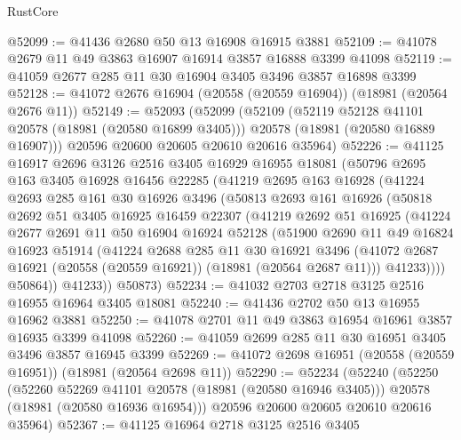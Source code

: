 \begin{lexlean}{RustCore}
\begin{coremodule}
@52099 := @41436 @2680 @50 @13 @16908 @16915 @3881
@52109 := @41078 @2679 @11 @49 @3863 @16907 @16914 @3857 @16888 @3399 @41098
@52119 := @41059 @2677 @285 @11 @30 @16904 @3405 @3496 @3857 @16898 @3399
@52128 := @41072 @2676 @16904 (@20558 (@20559 @16904)) (@18981 (@20564 @2676 @11))
@52149 := @52093
    (@52099
      (@52109
        (@52119 @52128 @41101 @20578 (@18981 (@20580 @16899 @3405)))
        @20578
        (@18981 (@20580 @16889 @16907)))
      @20596
      @20600
      @20605
      @20610
      @20616
      @35964)
@52226 := @41125
    @16917
    @2696
    @3126
    @2516
    @3405
    @16929
    @16955
    @18081
    (@50796
      @2695
      @163
      @3405
      @16928
      @16456
      @22285
      (@41219
        @2695
        @163
        @16928
        (@41224
          @2693
          @285
          @161
          @30
          @16926
          @3496
          (@50813
            @2693
            @161
            @16926
            (@50818
              @2692
              @51
              @3405
              @16925
              @16459
              @22307
              (@41219
                @2692
                @51
                @16925
                (@41224
                  @2677
                  @2691
                  @11
                  @50
                  @16904
                  @16924
                  @52128
                  (@51900
                    @2690
                    @11
                    @49
                    @16824
                    @16923
                    @51914
                    (@41224
                      @2688
                      @285
                      @11
                      @30
                      @16921
                      @3496
                      (@41072 @2687 @16921 (@20558 (@20559 @16921)) (@18981 (@20564 @2687 @11)))
                      @41233))))
              @50864))
          @41233))
      @50873)
@52234 := @41032 @2703 @2718 @3125 @2516 @16955 @16964 @3405 @18081
@52240 := @41436 @2702 @50 @13 @16955 @16962 @3881
@52250 := @41078 @2701 @11 @49 @3863 @16954 @16961 @3857 @16935 @3399 @41098
@52260 := @41059 @2699 @285 @11 @30 @16951 @3405 @3496 @3857 @16945 @3399
@52269 := @41072 @2698 @16951 (@20558 (@20559 @16951)) (@18981 (@20564 @2698 @11))
@52290 := @52234
    (@52240
      (@52250
        (@52260 @52269 @41101 @20578 (@18981 (@20580 @16946 @3405)))
        @20578
        (@18981 (@20580 @16936 @16954)))
      @20596
      @20600
      @20605
      @20610
      @20616
      @35964)
@52367 := @41125
    @16964
    @2718
    @3125
    @2516
    @3405

\end{coremodule}
\end{lexlean}
